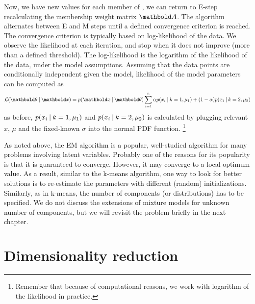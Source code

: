 Now, we have new values for each member of  \vect{\theta},
we can return to E-step recalculating
the membership weight matrix $\vect{A}$.
The algorithm alternates between E and M steps
until a defined convergence criterion is reached.
The convergence criterion is typically based on log-likelihood of the data.
We observe the likelihood at each iteration,
and stop when it does not improve (more than a defined threshold).
The log-likelihood is the logarithm of the likelihood of the data,
under the model assumptions.
Assuming that the data points are conditionally independent given the model,
likelihood of the model parameters can be computed as 
\[
  \mathcal{L}(\vect{\theta}\given{}\vect{x}) =
            p(\vect{x}\given\vect{\theta})
            \sum_{i=1}^{n} \alpha  p(x_{i} \given{}k=1, \mu_{1}) + 
              (1-\alpha) p(x_{i} \given{}k=2, \mu_{2})
\]
as before, $p(x_{i} \:\vert\:{}k=1, \mu_{1})$
and $p(x_{i} \:\vert\:{}k=2, \mu_{2})$
is calculated by plugging relevant $x$, $\mu$ and
the fixed-known $\sigma$ into the normal PDF function.%
\footnote{Remember that because of computational reasons,
  we work with logarithm of the likelihood in practice.
}

As noted above,
the EM algorithm is a popular, well-studied algorithm for many problems
involving latent variables.
Probably one of the reasons for its popularity is that
it is guaranteed to converge.
However, it may converge to a local optimum value.
As a result, similar to the k-means algorithm,
one way to look for better solutions is to re-estimate
the parameters with different (random) initializations.
Similarly, as in k-means,
the number of components (or distributions) has to be specified.
We do not discuss the extensions of mixture models
for unknown number of components,
but we will revisit the problem briefly in the next chapter. %


\section{Dimensionality reduction}

